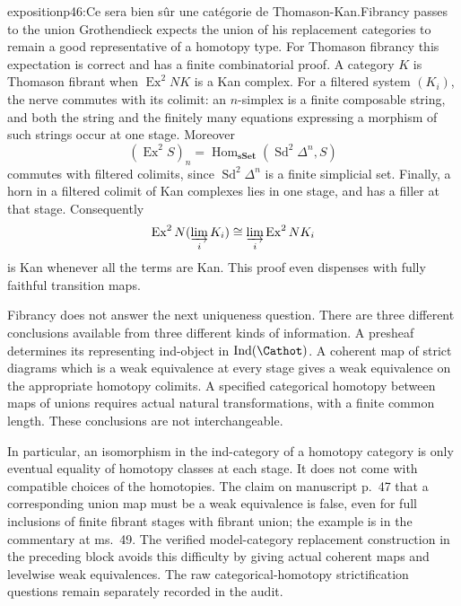 \begin{dcomment}{exposition}{p46:Ce sera bien sûr une catégorie de Thomason-Kan.}{Fibrancy passes to the union}
Grothendieck expects the union of his replacement categories to remain a good representative of a homotopy type. For Thomason fibrancy this expectation is correct and has a finite combinatorial proof. A category $K$ is Thomason fibrant when $\operatorname{Ex}^2NK$ is a Kan complex. For a filtered system $(K_i)$, the nerve commutes with its colimit: an $n$-simplex is a finite composable string, and both the string and the finitely many equations expressing a morphism of such strings occur at one stage. Moreover
\[
 (\operatorname{Ex}^2 S)_n
   =\operatorname{Hom}_{\mathbf{sSet}}(\operatorname{Sd}^2\Delta^n,S)
\]
commutes with filtered colimits, since $\operatorname{Sd}^2\Delta^n$ is a finite simplicial set. Finally, a horn in a filtered colimit of Kan complexes lies in one stage, and has a filler at that stage. Consequently
\[
 \operatorname{Ex}^2N(\varinjlim_i K_i)
       \cong\varinjlim_i\operatorname{Ex}^2NK_i
\]
is Kan whenever all the terms are Kan. This proof even dispenses with fully faithful transition maps.

Fibrancy does not answer the next uniqueness question. There are three different conclusions available from three different kinds of information. A presheaf determines its representing ind-object in $\operatorname{Ind}(\Cathot)$. A coherent map of strict diagrams which is a weak equivalence at every stage gives a weak equivalence on the appropriate homotopy colimits. A specified categorical homotopy between maps of unions requires actual natural transformations, with a finite common length. These conclusions are not interchangeable.

In particular, an isomorphism in the ind-category of a homotopy category is only eventual equality of homotopy classes at each stage. It does not come with compatible choices of the homotopies. The claim on manuscript p.~47 that a corresponding union map must be a weak equivalence is false, even for full inclusions of finite fibrant stages with fibrant union; the example is in the commentary at ms.~49. The verified model-category replacement construction in the preceding block avoids this difficulty by giving actual coherent maps and levelwise weak equivalences. The raw categorical-homotopy strictification questions remain separately recorded in the audit.
\end{dcomment}

